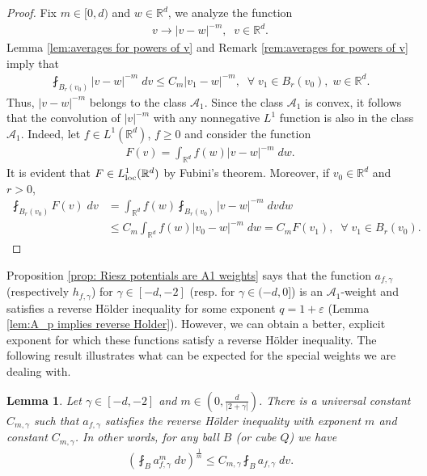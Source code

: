 \documentclass[12pt,american]{amsart}
\numberwithin{equation}{section}
\theoremstyle{plain}
\newtheorem{lem}[thm]{Lemma}
\theoremstyle{definition}                  %
\begin{document}
\begin{proof}
 Fix $m \in [0,d)$ and $w \in \mathbb{R}^d$, we analyze the function
  \begin{align*}	
    v \to |v-w|^{-m},\;\;v\in\mathbb{R}^d.	
  \end{align*}
   Lemma \ref{lem:averages for powers of v} and Remark \ref{rem:averages for powers of v} imply that  
  \begin{align*}
    \fint_{B_r(v_0)}|v-w|^{-m}\;dv \leq C_m|v_1-w|^{-m},\;\;\forall\; v_1 \in B_r(v_0),\;w\in\mathbb{R}^d.
  \end{align*}
  Thus, $|v-w|^{-m}$ belongs to the class $\mathcal{A}_1$. Since the class $\mathcal{A}_1$ is convex, it follows that the convolution of $|v|^{-m}$ with any nonnegative $L^1$ function is also in the class $\mathcal{A}_1$. Indeed, let $f\in L^1(\mathbb{R}^d)$, $f\geq 0$ and consider the function
  \begin{align*}
    F(v) = \int_{\mathbb{R}^d}f(w)|v-w|^{-m}\;dw.	  
  \end{align*}	  
  It is evident that $F\in L^1_{\textnormal{loc}}(\mathbb{R}^d)$ by Fubini's theorem. Moreover, if $v_0\in\mathbb{R}^d$ and $r>0$,
  \begin{align*}
    \fint_{B_r(v_0)} F(v)\;dv & = \int_{\mathbb{R}^d}f(w)\fint_{B_r(v_0)}|v-w|^{-m}\;dvdw\\
	  & \leq C_m\int_{\mathbb{R}^d}f(w)|v_0-w|^{-m}\;dw = C_m F(v_1),\;\;\forall\;v_1\in B_r(v_0).
  \end{align*}	  
  \end{proof}
  Proposition \ref{prop: Riesz potentials are A1 weights} says that the function $a_{f,\gamma}$ (respectively $h_{f,\gamma}$) for $\gamma \in [-d,-2]$ (resp. for $\gamma \in (-d,0]$) is an $\mathcal{A}_1$-weight and satisfies a reverse H\"older inequality for some exponent $q=1+\varepsilon$ (Lemma \ref{lem:A_p implies reverse Holder}).  However, we can obtain a better, explicit exponent for which these functions satisfy a reverse H\"older inequality. The following result illustrates what can be expected for the special weights we are dealing with. 
  \begin{lem}\label{lem:a is reverse Holder with a nice constant}
    Let {{$\gamma \in [-d,-2]$}} and $m \in (0,\frac{d}{|2+\gamma|})$. There is a universal constant $C_{m,\gamma}$ such that $a_{f,\gamma}$ satisfies the reverse H\"older inequality with exponent $m$ and constant $C_{m,\gamma}$. In other words, for any ball $B$ (or cube $Q$) we have		
    \begin{align*}
      \left ( \fint_{B} a_{f,\gamma}^m \;dv \right )^{\frac{1}{m}} \leq C_{m,\gamma} \fint_{B}a_{f,\gamma}\;dv.	
    \end{align*}	 
  \end{lem}
\end{document}
